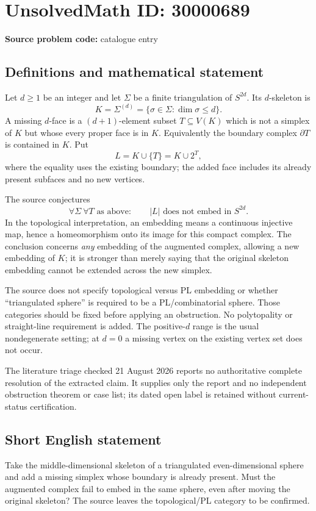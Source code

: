 \documentclass[11pt]{article}
\begin{document}
\section*{UnsolvedMath ID: 30000689}
\textbf{Source problem code:} catalogue entry
\subsection{Definitions and mathematical statement}
Let $d\geq1$ be an integer and let $\Sigma$ be a finite triangulation of $S^{2d}$. Its $d$-skeleton is
\[
 K=\Sigma^{(d)}=\{\sigma\in\Sigma:\dim\sigma\leq d\}.
\]
A missing $d$-face is a $(d+1)$-element subset $T\subseteq V(K)$ which is not a simplex of $K$ but whose every proper face is in $K$. Equivalently the boundary complex $\partial T$ is contained in $K$. Put
\[
 L=K\cup\{T\}=K\cup2^T,
\]
where the equality uses the existing boundary; the added face includes its already present subfaces and no new vertices.

The source conjectures
\[
 \forall\Sigma\ \forall T\text{ as above}:\qquad
 |L|\text{ does not embed in }S^{2d}.
\]
In the topological interpretation, an embedding means a continuous injective map, hence a homeomorphism onto its image for this compact complex. The conclusion concerns \emph{any} embedding of the augmented complex, allowing a new embedding of $K$; it is stronger than merely saying that the original skeleton embedding cannot be extended across the new simplex.

The source does not specify topological versus PL embedding or whether ``triangulated sphere'' is required to be a PL/combinatorial sphere. Those categories should be fixed before applying an obstruction. No polytopality or straight-line requirement is added. The positive-$d$ range is the usual nondegenerate setting; at $d=0$ a missing vertex on the existing vertex set does not occur.

The literature triage checked 21 August 2026 reports no authoritative complete resolution of the extracted claim. It supplies only the report and no independent obstruction theorem or case list; its dated open label is retained without current-status certification.
\subsection{Short English statement}
Take the middle-dimensional skeleton of a triangulated even-dimensional sphere and add a missing simplex whose boundary is already present. Must the augmented complex fail to embed in the same sphere, even after moving the original skeleton? The source leaves the topological/PL category to be confirmed.
\end{document}
